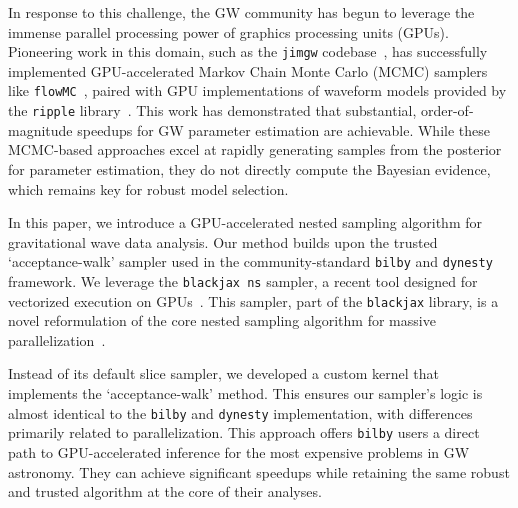 \documentclass[fleqn,usenatbib]{mnras}
\begin{document}
In response to this challenge, the GW community has begun to leverage the immense
parallel processing power of graphics processing units (GPUs). Pioneering work in
this domain, such as the \texttt{jimgw} codebase~\citep{wong2023fastgravitationalwaveparameter}, has successfully
implemented GPU-accelerated Markov Chain Monte Carlo (MCMC) samplers like \texttt{flowMC}~\citep{flowMC}, 
paired with GPU implementations of waveform models provided by the
\texttt{ripple} library~\citep{ripple}. This work has demonstrated that
substantial, order-of-magnitude speedups for GW parameter estimation are
achievable. While these MCMC-based approaches excel at rapidly generating samples
from the posterior for parameter estimation, they do not directly compute the
Bayesian evidence, which remains key for robust model selection.

In this paper, we introduce a GPU-accelerated nested sampling
algorithm for gravitational wave data analysis. Our method
builds upon the trusted `acceptance-walk' sampler used in the
community-standard \texttt{bilby} and \texttt{dynesty} framework.
We leverage the \texttt{blackjax ns} sampler, a recent tool
designed for vectorized execution on GPUs~\citep{yallup2025nested}.
This sampler, part of the \texttt{blackjax} library, is a novel reformulation
of the core nested sampling algorithm for massive parallelization~\citep{cabezas2024blackjax}.

Instead of its default slice sampler, we developed a custom
kernel that implements the `acceptance-walk' method. This
ensures our sampler's logic is almost identical to the
\texttt{bilby} and \texttt{dynesty} implementation, with differences
primarily related to parallelization. This approach offers
\texttt{bilby} users a direct path to GPU-accelerated inference for the most expensive problems in GW astronomy.
They can achieve significant speedups while retaining the same
robust and trusted algorithm at the core of their analyses.
\end{document}
